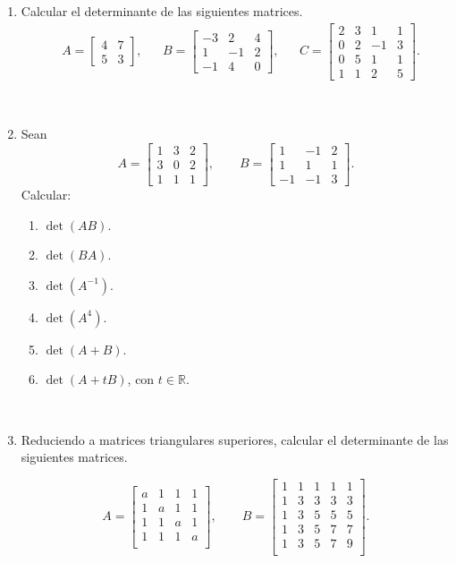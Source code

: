 \documentclass[a4paper,12pt,twoside,spanish,reqno]{amsbook}
\numberwithin{equation}{section}
\begin{document}
\begin{enumerate}
\item Calcular el determinante de las siguientes matrices.
	\begin{align*}
	&A=\begin{bmatrix} 4&7\\ 5&3\end{bmatrix},
	&&B=\begin{bmatrix} -3&2&4\\ 1&-1&2\\ -1&4&0\end{bmatrix},
	&&
	C=\begin{bmatrix} 2&3&1&1\\ 0&2&-1&3 \\ 0&5&1&1 \\1&1&2&5\end{bmatrix}.
	\end{align*}

\

\item Sean
		$$A=
	\begin{bmatrix}
		1&3&2 \\
		3&0&2 \\
		1&1&1
	\end{bmatrix}, \qquad
	B =
	\begin{bmatrix}
		1&-1&2\\
		1&1&1 \\
		-1&-1&3
	\end{bmatrix}.
	$$
	Calcular:
	\begin{multicols}{3}
	\begin{enumerate}
		\item $\det(AB)$.
		\item $\det(BA)$.
		\item $\det(A^{-1})$.
		\item $\det(A^{4})$.
		\item $\det(A+B)$.
		\item $\det(A+tB)$, con $t \in \mathbb{R}$.
	\end{enumerate}
\end{multicols}


\

\item Reduciendo a matrices triangulares superiores, calcular el determinante de las siguientes matrices.

		$$A =
		\begin{bmatrix}
			a&1&1&1 \\
			1&a&1&1 \\
			1&1&a&1 \\
			1&1&1&a \\
		\end{bmatrix}, \qquad	
        B =
		\begin{bmatrix}
			1&1&1&1&1 \\
			1&3&3&3&3 \\
			1&3&5&5&5 \\
			1&3&5&7&7 \\
			1&3&5&7&9 \\
		\end{bmatrix}.
		$$


\end{enumerate}
\end{document}
